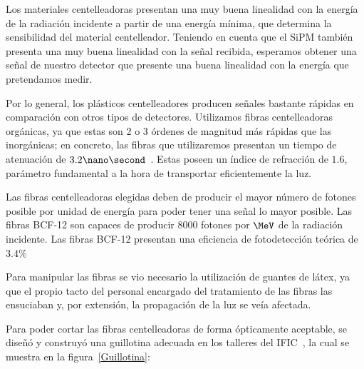 Los materiales centelleadoras presentan una muy buena linealidad con la energía de la radiación incidente a partir de una energía mínima, que determina la sensibilidad del material centelleador. Teniendo en cuenta que el SiPM también presenta una muy buena linealidad con la señal recibida, esperamos obtener una señal de nuestro detector que presente una buena linealidad con la energía que pretendamos medir.

Por lo general, los plásticos centelleadores producen señales bastante rápidas en comparación con otros tipos de detectores. Utilizamos fibras centelleadoras orgánicas, ya que estas son 2 o 3 órdenes de magnitud más rápidas que las inorgánicas;  en concreto, las fibras que utilizaremos presentan un tiempo de atenuación de $3.2 \nano\second$~\cite{datasheet}. Estas poseen un índice de refracción de $1.6$, parámetro fundamental a la hora de transportar eficientemente la luz.

Las fibras centelleadoras elegidas deben de producir el mayor número de fotones  posible por unidad de energía para poder tener una señal lo mayor posible. Las fibras BCF-12 son capaces de producir $8000$ fotones por $\MeV$ de la radiación incidente. Las fibras BCF-12 presentan una eficiencia de fotodetección teórica de $3.4\%$~\cite{datasheet}

Para manipular las fibras se vio necesario la utilización de guantes de látex, ya que el propio tacto  del personal encargado del tratamiento de las fibras las ensuciaban y, por extensión, la propagación de la luz se veía afectada.

Para poder cortar las fibras centelleadoras de forma ópticamente aceptable, se diseñó y construyó una guillotina adecuada en los talleres del IFIC~\cite{Alberto,anguloytiempo, dependencias, tesisfibras}, la cual se muestra en la figura~\ref{Guillotina}:

